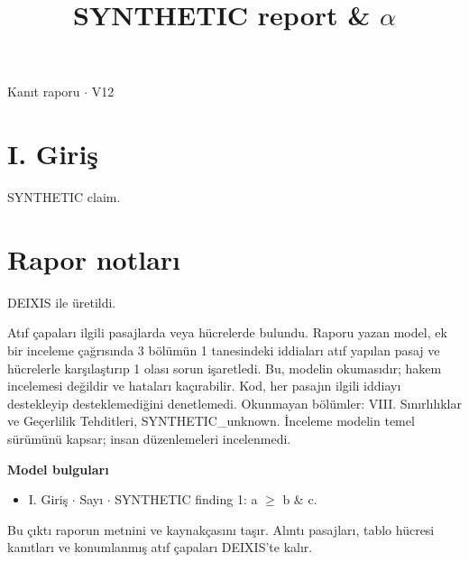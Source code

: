 \documentclass[journal]{IEEEtran}
\begin{document}
\renewcommand{\abstractname}{Özet}
\renewcommand{\IEEEkeywordsname}{Dizin Terimleri}
\renewcommand{\refname}{Kaynaklar}

\title{SYNTHETIC report \& \ensuremath{\alpha}}

\maketitle

\noindent Kanıt raporu \ensuremath{\cdot} V12

\section*{I. Giriş}

SYNTHETIC claim. \cite{Synth26}

\section*{Rapor notları}

DEIXIS ile üretildi.

Atıf çapaları ilgili pasajlarda veya hücrelerde bulundu. Raporu yazan model, ek bir inceleme çağrısında 3 bölümün 1 tanesindeki iddiaları atıf yapılan pasaj ve hücrelerle karşılaştırıp 1 olası sorun işaretledi. Bu, modelin okumasıdır; hakem incelemesi değildir ve hataları kaçırabilir. Kod, her pasajın ilgili iddiayı destekleyip desteklemediğini denetlemedi. Okunmayan bölümler: VIII. Sınırlılıklar ve Geçerlilik Tehditleri, SYNTHETIC\_unknown. İnceleme modelin temel sürümünü kapsar; insan düzenlemeleri incelenmedi.

\noindent\textbf{Model bulguları}

\begin{itemize}
\item I. Giriş \ensuremath{\cdot} Sayı \ensuremath{\cdot} SYNTHETIC finding 1: a \ensuremath{\geq} b \& c.
\end{itemize}

Bu çıktı raporun metnini ve kaynakçasını taşır. Alıntı pasajları, tablo hücresi kanıtları ve konumlanmış atıf çapaları DEIXIS'te kalır.




\end{document}
